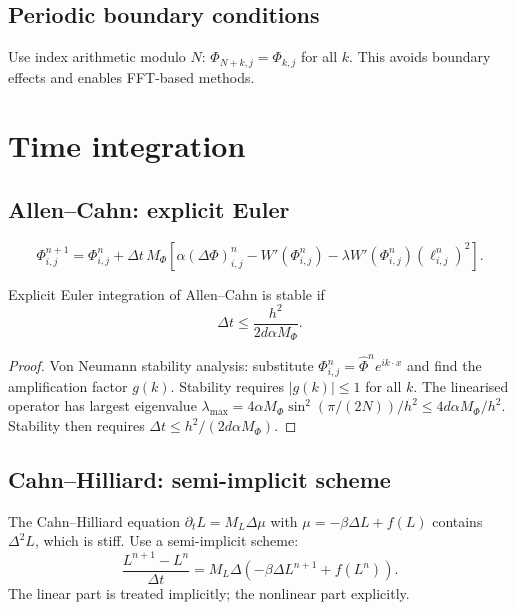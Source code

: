 \subsection*{Periodic boundary conditions}

Use index arithmetic modulo $N$:
$\Phi_{N+k,j} = \Phi_{k,j}$ for all $k$.
This avoids boundary effects and enables FFT-based methods.

\section{Time integration}

\subsection*{Allen--Cahn: explicit Euler}

\[
  \Phi^{n+1}_{i,j}
  = \Phi^n_{i,j}
  + \Delta t\,M_\Phi\!\left[
    \alpha(\Delta\Phi)^n_{i,j}
    - W'(\Phi^n_{i,j})
    - \lambda W'(\Phi^n_{i,j})(\ell^n_{i,j})^2
  \right].
\]

\begin{theorem}
  \label{thm:cfl-ac}
  \statusproven{}
  Explicit Euler integration of Allen--Cahn is stable if
  \[
    \Delta t \leq \frac{h^2}{2d\alpha M_\Phi}.
  \]
\end{theorem}

\begin{proof}
  Von Neumann stability analysis: substitute
  $\Phi^n_{i,j} = \hat\Phi^n e^{ik\cdot x}$ and find
  the amplification factor $g(k)$.
  Stability requires $|g(k)| \leq 1$ for all $k$.
  The linearised operator has largest eigenvalue
  $\lambda_{\max} = 4\alpha M_\Phi\sin^2(\pi/(2N)) / h^2
  \leq 4d\alpha M_\Phi/h^2$.
  Stability then requires $\Delta t \leq h^2/(2d\alpha M_\Phi)$.
\end{proof}

\subsection*{Cahn--Hilliard: semi-implicit scheme}

The Cahn--Hilliard equation $\partial_t L = M_L\Delta\mu$
with $\mu = -\beta\Delta L + f(L)$ contains $\Delta^2 L$,
which is stiff.
Use a semi-implicit scheme:
\[
  \frac{L^{n+1} - L^n}{\Delta t}
  = M_L\Delta\!\left(-\beta\Delta L^{n+1} + f(L^n)\right).
\]
The linear part is treated implicitly; the nonlinear part
explicitly.


